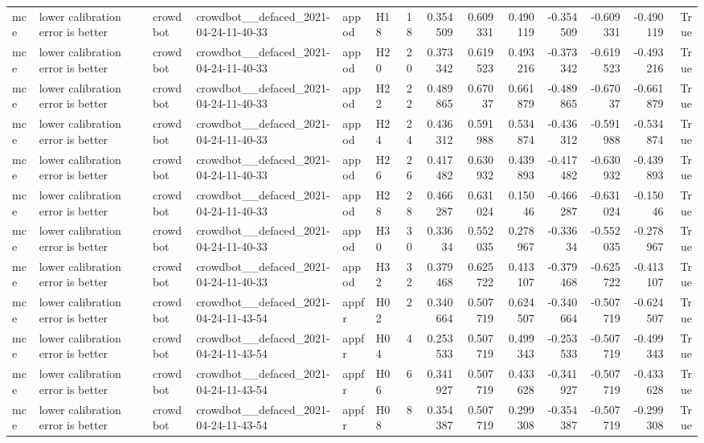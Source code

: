 \begin{longtable}{llllllrrrrrrrr}
mce & lower calibration error is better & crowdbot & crowdbot\_\_defaced\_2021-04-24-11-40-33 & appod & H18 & 18 & 0.354509 & 0.609331 & 0.490119 & -0.354509 & -0.609331 & -0.490119 & True \\
mce & lower calibration error is better & crowdbot & crowdbot\_\_defaced\_2021-04-24-11-40-33 & appod & H20 & 20 & 0.373342 & 0.619523 & 0.493216 & -0.373342 & -0.619523 & -0.493216 & True \\
mce & lower calibration error is better & crowdbot & crowdbot\_\_defaced\_2021-04-24-11-40-33 & appod & H22 & 22 & 0.489865 & 0.67037 & 0.661879 & -0.489865 & -0.67037 & -0.661879 & True \\
mce & lower calibration error is better & crowdbot & crowdbot\_\_defaced\_2021-04-24-11-40-33 & appod & H24 & 24 & 0.436312 & 0.591988 & 0.534874 & -0.436312 & -0.591988 & -0.534874 & True \\
mce & lower calibration error is better & crowdbot & crowdbot\_\_defaced\_2021-04-24-11-40-33 & appod & H26 & 26 & 0.417482 & 0.630932 & 0.439893 & -0.417482 & -0.630932 & -0.439893 & True \\
mce & lower calibration error is better & crowdbot & crowdbot\_\_defaced\_2021-04-24-11-40-33 & appod & H28 & 28 & 0.466287 & 0.631024 & 0.15046 & -0.466287 & -0.631024 & -0.15046 & True \\
mce & lower calibration error is better & crowdbot & crowdbot\_\_defaced\_2021-04-24-11-40-33 & appod & H30 & 30 & 0.33634 & 0.552035 & 0.278967 & -0.33634 & -0.552035 & -0.278967 & True \\
mce & lower calibration error is better & crowdbot & crowdbot\_\_defaced\_2021-04-24-11-40-33 & appod & H32 & 32 & 0.379468 & 0.625722 & 0.413107 & -0.379468 & -0.625722 & -0.413107 & True \\
mce & lower calibration error is better & crowdbot & crowdbot\_\_defaced\_2021-04-24-11-43-54 & appfr & H02 & 2 & 0.340664 & 0.507719 & 0.624507 & -0.340664 & -0.507719 & -0.624507 & True \\
mce & lower calibration error is better & crowdbot & crowdbot\_\_defaced\_2021-04-24-11-43-54 & appfr & H04 & 4 & 0.253533 & 0.507719 & 0.499343 & -0.253533 & -0.507719 & -0.499343 & True \\
mce & lower calibration error is better & crowdbot & crowdbot\_\_defaced\_2021-04-24-11-43-54 & appfr & H06 & 6 & 0.341927 & 0.507719 & 0.433628 & -0.341927 & -0.507719 & -0.433628 & True \\
mce & lower calibration error is better & crowdbot & crowdbot\_\_defaced\_2021-04-24-11-43-54 & appfr & H08 & 8 & 0.354387 & 0.507719 & 0.299308 & -0.354387 & -0.507719 & -0.299308 & True \\

\end{longtable}
